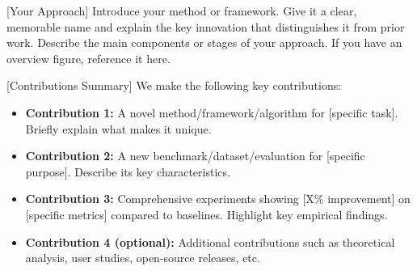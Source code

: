 [Your Approach] Introduce your method or framework. Give it a clear, memorable name and explain the key innovation that distinguishes it from prior work. Describe the main components or stages of your approach. If you have an overview figure, reference it here.


[Contributions Summary] We make the following key contributions:
\begin{itemize}
    \item \textbf{Contribution 1:} A novel method/framework/algorithm for [specific task]. Briefly explain what makes it unique.
    \item \textbf{Contribution 2:} A new benchmark/dataset/evaluation for [specific purpose]. Describe its key characteristics.
    \item \textbf{Contribution 3:} Comprehensive experiments showing [X\% improvement] on [specific metrics] compared to baselines. Highlight key empirical findings.
    \item \textbf{Contribution 4 (optional):} Additional contributions such as theoretical analysis, user studies, open-source releases, etc.
\end{itemize}


